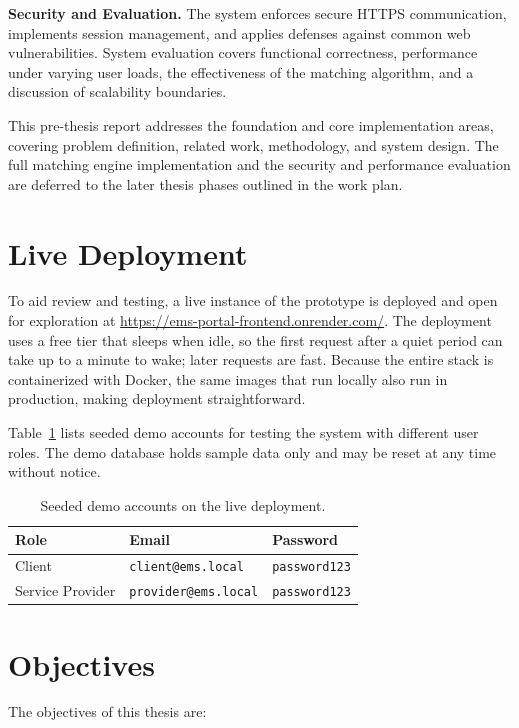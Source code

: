 \textbf{Security and Evaluation.} The system enforces secure HTTPS
communication, implements session management, and applies defenses against
common web vulnerabilities. System evaluation covers functional correctness,
performance under varying user loads, the effectiveness of the matching
algorithm, and a discussion of scalability boundaries.

This pre-thesis report addresses the foundation and core implementation areas,
covering problem definition, related work, methodology, and system design. The
full matching engine implementation and the security and performance evaluation
are deferred to the later thesis phases outlined in the work plan.

\section{Live Deployment}
To aid review and testing, a live instance of the prototype is deployed and open
for exploration at \url{https://ems-portal-frontend.onrender.com/}. The
deployment uses a free tier that sleeps when idle, so the first request after a
quiet period can take up to a minute to wake; later requests are fast. Because
the entire stack is containerized with Docker, the same images that run locally
also run in production, making deployment straightforward.

Table~\ref{tab:demo} lists seeded demo accounts for testing the system with
different user roles. The demo database holds sample data only and may be reset
at any time without notice.

\begin{table}[ht]
	\centering
	\caption{Seeded demo accounts on the live deployment.}
	\label{tab:demo}
	\begin{tabular}{lll}
		\hline
		\textbf{Role} & \textbf{Email} & \textbf{Password} \\ \hline
		Client & \texttt{client@ems.local} & \texttt{password123} \\
		Service Provider & \texttt{provider@ems.local} & \texttt{password123} \\
		\hline
	\end{tabular}
\end{table}

\section{Objectives}
The objectives of this thesis are:

